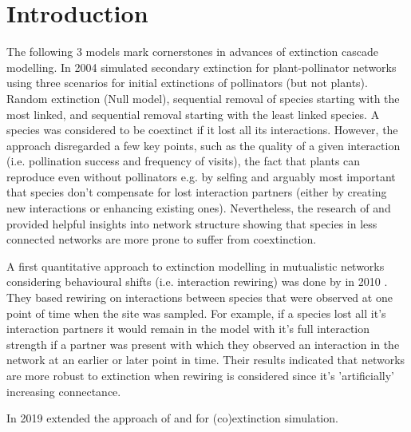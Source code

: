 \documentclass[12pt,a4paper]{article}
\begin{document}
\section{Introduction}
The following 3 models mark cornerstones in advances of extinction cascade modelling. In 2004 \citeauthor{memmott2004} simulated secondary extinction for plant-pollinator networks using three scenarios for initial extinctions of pollinators (but not plants). Random extinction (Null model), sequential removal of species starting with the most linked, and sequential removal starting with the least linked species. A species was considered to be coextinct if it lost all its interactions. However, the approach disregarded a few key points, such as the quality of a given interaction (i.e. pollination success and frequency of visits), the fact that plants can reproduce even without pollinators e.g. by selfing and arguably most important that species don't compensate for lost interaction partners (either by creating new interactions or enhancing existing ones). Nevertheless, the research of \citeauthor{dunne2002} and \citeauthor{memmott2004} provided helpful insights into network structure showing that species in less connected networks are more prone to suffer from coextinction. \par

A first quantitative approach to extinction modelling in mutualistic networks considering behavioural shifts (i.e. interaction rewiring) was done by \citeauthor{kaiser-bunbury2010} in 2010 \parencite{kaiser-bunbury2010}. They based rewiring on interactions between species that were observed at one point of time when the site was sampled. For example, if a species lost all it's interaction partners it would remain in the model with it's full interaction strength if a partner was present with which they observed an interaction in the network at an earlier or later point in time. Their results indicated that networks are more robust to extinction when rewiring is considered since it's 'artificially' increasing connectance. \par

In 2019 \citeauthor{vizentin-bugoni2019} extended the approach of \citeauthor{memmott2004} and \citeauthor{dunne2002} \parencite{memmott2004, dunne2002} for (co)extinction simulation.
\end{document}
